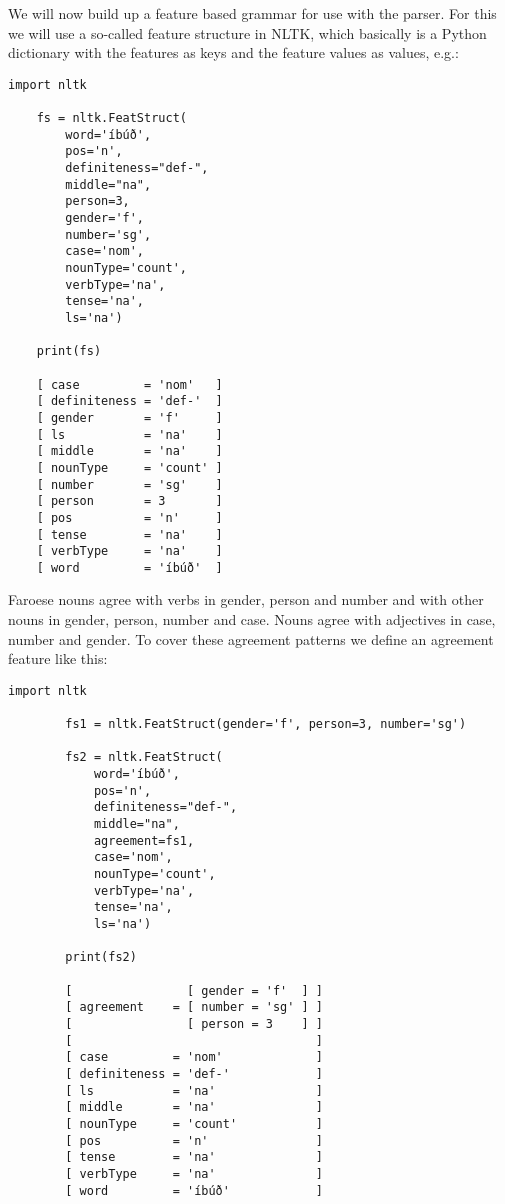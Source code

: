 \documentclass[12pt,%
]{lin-v2/lin}
\begin{document}
We will now build up a feature based grammar for use with the parser. For this we will use
a so-called feature structure in NLTK, which basically is a Python dictionary with the
features as keys and the feature values as values, e.g.:
\begin{lstlisting}[caption={A feature structure showing lexical features for the word \emph{íbúð}.}]
    import nltk
    
    fs = nltk.FeatStruct(
        word='íbúð',
        pos='n',
        definiteness="def-",
        middle="na",
        person=3,
        gender='f',
        number='sg',
        case='nom',
        nounType='count',
        verbType='na',
        tense='na',
        ls='na')

    print(fs)

    [ case         = 'nom'   ]
    [ definiteness = 'def-'  ]
    [ gender       = 'f'     ]
    [ ls           = 'na'    ]
    [ middle       = 'na'    ]
    [ nounType     = 'count' ]
    [ number       = 'sg'    ]
    [ person       = 3       ]
    [ pos          = 'n'     ]
    [ tense        = 'na'    ]
    [ verbType     = 'na'    ]
    [ word         = 'íbúð'  ]
\end{lstlisting}


Faroese nouns agree with verbs in gender, person and number and with other nouns in
gender, person, number and case. Nouns agree with adjectives in case, number and gender.
To cover these agreement patterns we define an agreement feature like this:
\begin{lstlisting}[caption={A feature structure showing the word \emph{íbúð} with an \emph{agreement} feature.}]
        import nltk
        
        fs1 = nltk.FeatStruct(gender='f', person=3, number='sg')
        
        fs2 = nltk.FeatStruct(
            word='íbúð',
            pos='n',
            definiteness="def-",
            middle="na",
            agreement=fs1,
            case='nom',
            nounType='count',
            verbType='na',
            tense='na',
            ls='na')
    
        print(fs2)
    
        [                [ gender = 'f'  ] ]
        [ agreement    = [ number = 'sg' ] ]
        [                [ person = 3    ] ]
        [                                  ]
        [ case         = 'nom'             ]
        [ definiteness = 'def-'            ]
        [ ls           = 'na'              ]
        [ middle       = 'na'              ]
        [ nounType     = 'count'           ]
        [ pos          = 'n'               ]
        [ tense        = 'na'              ]
        [ verbType     = 'na'              ]
        [ word         = 'íbúð'            ]
\end{lstlisting}
\end{document}
